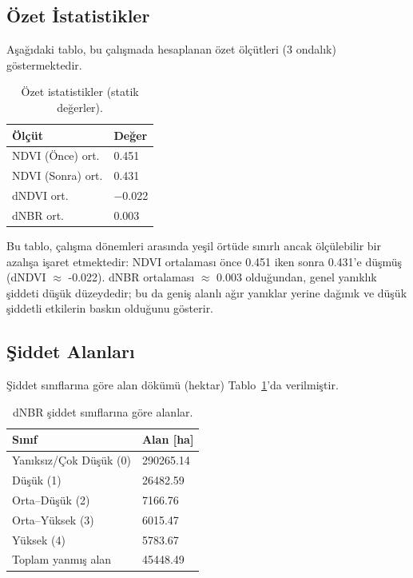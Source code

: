 \documentclass[11pt,a4paper]{article}
\begin{document}
\subsection{Özet İstatistikler}
Aşağıdaki tablo, bu çalışmada hesaplanan özet ölçütleri (3 ondalık) göstermektedir.
\begin{table}[H]
  \centering
  \begin{tabular}{@{}ll@{}}
  \toprule
  Ölçüt & Değer \\
  \midrule
  NDVI (Önce) ort. & \num{0.451} \\
  NDVI (Sonra) ort. & \num{0.431} \\
  dNDVI ort. & \num{-0.022} \\
  dNBR ort. & \num{0.003} \\
  \bottomrule
  \end{tabular}
  \caption{Özet istatistikler (statik değerler).}
\end{table}

\noindent Bu tablo, çalışma dönemleri arasında yeşil örtüde sınırlı ancak ölçülebilir bir azalışa işaret etmektedir: NDVI ortalaması önce 0.451 iken sonra 0.431'e düşmüş (dNDVI $\approx$ -0.022). dNBR ortalaması $\approx$ 0.003 olduğundan, genel yanıklık şiddeti düşük düzeydedir; bu da geniş alanlı ağır yanıklar yerine dağınık ve düşük şiddetli etkilerin baskın olduğunu gösterir.


\subsection{Şiddet Alanları}
Şiddet sınıflarına göre alan dökümü (hektar) Tablo~\ref{tab:areas}'da verilmiştir.
\begin{table}[H]
  \centering
  \begin{tabular}{@{}ll@{}}
  \toprule
  Sınıf & Alan [ha] \\
  \midrule
  Yanıksız/Çok Düşük (0) & \num{290265.14} \\
  Düşük (1) & \num{26482.59} \\
  Orta--Düşük (2) & \num{7166.76} \\
  Orta--Yüksek (3) & \num{6015.47} \\
  Yüksek (4) & \num{5783.67} \\
  Toplam yanmış alan & \num{45448.49} \\
  \bottomrule
  \end{tabular}
  \caption{dNBR şiddet sınıflarına göre alanlar.}
  \label{tab:areas}
\end{table}
\end{document}
